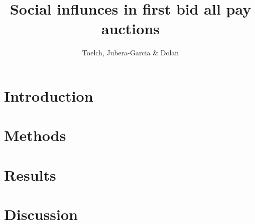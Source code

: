 \documentclass [man]{apa6}
\title{Social influnces in first bid all pay auctions}
\date{}
\author{Toelch, Jubera-Garcia \& Dolan}
\begin{document}
\maketitle

\section{Introduction}
\section {Methods}
\section{Results}
\section{Discussion}



{}

\end{document}
